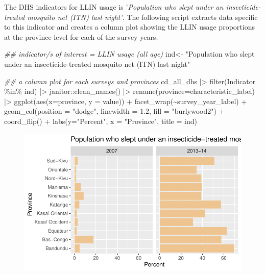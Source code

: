 \documentclass[
  letterpaper,
  DIV=11,
  numbers=noendperiod]{scrreprt}
\newenvironment{Shaded}{\begin{snugshade}}{\end{snugshade}}
\newcommand{\AttributeTok}[1]{\textcolor[rgb]{0.40,0.45,0.13}{#1}}
\newcommand{\DocumentationTok}[1]{\textcolor[rgb]{0.37,0.37,0.37}{\textit{#1}}}
\newcommand{\FloatTok}[1]{\textcolor[rgb]{0.68,0.00,0.00}{#1}}
\newcommand{\FunctionTok}[1]{\textcolor[rgb]{0.28,0.35,0.67}{#1}}
\newcommand{\NormalTok}[1]{\textcolor[rgb]{0.00,0.23,0.31}{#1}}
\newcommand{\OtherTok}[1]{\textcolor[rgb]{0.00,0.23,0.31}{#1}}
\newcommand{\SpecialCharTok}[1]{\textcolor[rgb]{0.37,0.37,0.37}{#1}}
\newcommand{\StringTok}[1]{\textcolor[rgb]{0.13,0.47,0.30}{#1}}
\begin{document}
The DHS indicators for LLIN usage is '\emph{Population who slept under
an insecticide-treated mosquito net (ITN) last night'}. The following
script extracts data specific to this indicator and creates a column
plot showing the LLIN usage proportions at the province level for each
of the survey years.~

\begin{Shaded}
\begin{Highlighting}[]
\DocumentationTok{\#\# indicator/s of interest = LLIN usage (all age)}
\NormalTok{ind}\OtherTok{\textless{}{-}} \StringTok{"Population who slept under an insecticide{-}treated mosquito net (ITN) last night"}

\DocumentationTok{\#\# a column plot for each surveys and provinces}
\NormalTok{cd\_all\_dhs }\SpecialCharTok{|\textgreater{}}
  \FunctionTok{filter}\NormalTok{(Indicator }\SpecialCharTok{\%in\%}\NormalTok{ ind) }\SpecialCharTok{|\textgreater{}}
\NormalTok{janitor}\SpecialCharTok{::}\FunctionTok{clean\_names}\NormalTok{() }\SpecialCharTok{|\textgreater{}}  
  \FunctionTok{rename}\NormalTok{(}\AttributeTok{province=}\NormalTok{characteristic\_label) }\SpecialCharTok{|\textgreater{}}
  \FunctionTok{ggplot}\NormalTok{(}\FunctionTok{aes}\NormalTok{(}\AttributeTok{x=}\NormalTok{province, }\AttributeTok{y =}\NormalTok{ value)) }\SpecialCharTok{+}
  \FunctionTok{facet\_wrap}\NormalTok{(}\SpecialCharTok{\textasciitilde{}}\NormalTok{survey\_year\_label) }\SpecialCharTok{+}
  \FunctionTok{geom\_col}\NormalTok{(}\AttributeTok{position =} \StringTok{"dodge"}\NormalTok{, }\AttributeTok{linewidth =} \FloatTok{1.2}\NormalTok{, }\AttributeTok{fill =} \StringTok{"burlywood2"}\NormalTok{) }\SpecialCharTok{+}
  \FunctionTok{coord\_flip}\NormalTok{() }\SpecialCharTok{+}
  \FunctionTok{labs}\NormalTok{(}\AttributeTok{y=}\StringTok{"Percent"}\NormalTok{, }\AttributeTok{x =} \StringTok{"Province"}\NormalTok{,}
       \AttributeTok{title =}\NormalTok{ ind)}
\end{Highlighting}
\end{Shaded}

\begin{figure}[H]

{\centering \includegraphics{module_02_files/figure-pdf/unnamed-chunk-10-1.pdf}

}

\end{figure}
\end{document}
